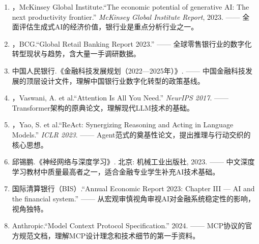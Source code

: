 \begin{notebox}[延伸阅读]
\begin{enumerate}[leftmargin=1.5em]
  \item \textcite{mckinsey2023ai}，McKinsey Global Institute.``The economic potential of generative AI: The next productivity frontier.'' \textit{McKinsey Global Institute Report}, 2023. —— 全面评估生成式AI的经济价值，银行业是重点分析行业之一。

  \item \textcite{bcg2023retail}，BCG.``Global Retail Banking Report 2023.'' —— 全球零售银行业的数字化转型现状与趋势，含大量一手调研数据。

  \item 中国人民银行.《金融科技发展规划（2022—2025年）》. —— 中国金融科技发展的顶层设计文件，理解中国银行业数字化转型的政策基线。

  \item \textcite{vaswani2017attention}，Vaswani, A. et al.``Attention Is All You Need.'' \textit{NeurIPS 2017}. —— Transformer架构的原典论文，理解现代LLM技术的基础。

  \item \textcite{yao2023react}，Yao, S. et al.``ReAct: Synergizing Reasoning and Acting in Language Models.'' \textit{ICLR 2023}. —— Agent范式的奠基性论文，提出推理与行动交织的核心思想。

  \item 邱锡鹏.《神经网络与深度学习》. 北京: 机械工业出版社, 2023. —— 中文深度学习教材中质量最高者之一，适合金融专业学生补充AI技术基础。

  \item 国际清算银行（BIS）.``Annual Economic Report 2023: Chapter III — AI and the financial system.'' —— 从宏观审慎视角审视AI对金融系统稳定性的影响，视角独特。

  \item Anthropic.``Model Context Protocol Specification.'' 2024. —— MCP协议的官方规范文档，理解MCP设计理念和技术细节的第一手资料。
\end{enumerate}
\end{notebox}
